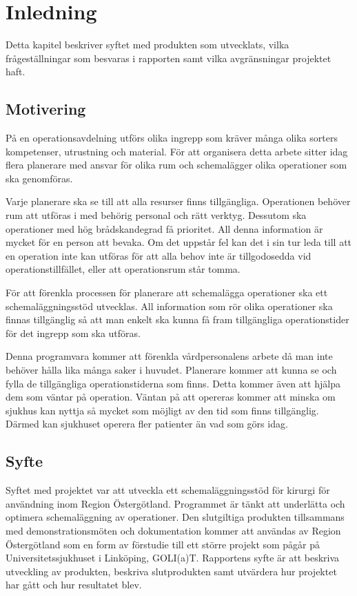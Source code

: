 \chapter{Inledning}
Detta kapitel beskriver syftet med produkten som utvecklats, vilka frågeställningar som besvaras i rapporten samt vilka avgränsningar projektet haft.

\section{Motivering}
På en operationsavdelning utförs olika ingrepp som kräver många olika sorters kompetenser, utrustning och material. 
För att organisera detta arbete sitter
idag flera planerare med ansvar för olika rum och schemalägger olika operationer som ska genomföras. 

Varje planerare ska se till att alla resurser finns tillgängliga. Operationen behöver rum att utföras i med behörig personal och rätt verktyg. Dessutom ska operationer med hög brådskandegrad få prioritet. All denna information är
mycket för en person att bevaka. Om det uppstår fel kan det i sin tur leda till att en operation inte kan utföras för att alla behov inte är tillgodosedda vid operationstillfället,
eller att operationsrum står tomma.

För att förenkla processen för planerare att schemalägga operationer ska ett schemaläggningsstöd utvecklas. All information som rör olika operationer ska finnas
tillgänglig så att man enkelt ska kunna få fram tillgängliga operationstider för det ingrepp som ska utföras. 

Denna programvara kommer att förenkla  vårdpersonalens arbete då man inte behöver hålla lika många saker i huvudet. Planerare kommer att kunna se och fylla de tillgängliga operationstiderna som finns.
Detta kommer även att hjälpa dem som väntar på operation. Väntan på att opereras kommer att minska om sjukhus kan nyttja så mycket som möjligt av den tid som finns tillgänglig. Därmed kan sjukhuset operera fler patienter än vad som görs idag.

\section{Syfte}\label{sec:syfte}
Syftet med projektet var att utveckla ett schemaläggningsstöd för kirurgi för användning inom Region Östergötland. Programmet är tänkt att underlätta och optimera schemaläggning av operationer. Den slutgiltiga produkten tillsammans med demonstrationsmöten och dokumentation kommer att användas av Region Östergötland som en form av förstudie till ett större projekt som pågår på Universitetssjukhuset i Linköping, GOLI(a)T. \cite{goliat} Rapportens syfte är att beskriva utveckling av produkten, beskriva slutprodukten samt utvärdera hur projektet har gått och hur resultatet blev.

